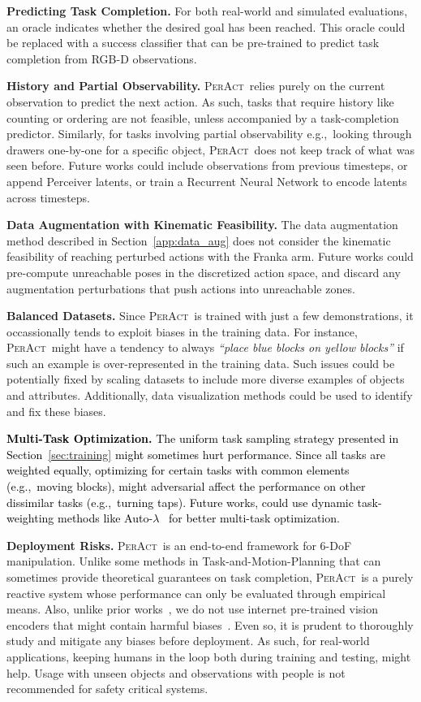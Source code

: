\documentclass{article}
\newcommand{\secref}[1]{Section~\ref{#1}}
\newcommand{\eg}{\textrm{e.g.,}\xspace}
\newcommand{\highlight}[1]{\textcolor{black}{#1}}
\newcommand{\model}{\textsc{PerAct}}
\begin{document}
\textbf{Predicting Task Completion.} For both real-world and simulated evaluations, an oracle indicates whether the desired goal has been reached. This oracle could be replaced with a success classifier that can be pre-trained to predict task completion from RGB-D observations. 

\textbf{History and Partial Observability.} \model~relies purely on the current observation to predict the next action. As such, tasks that require history like counting or ordering are not feasible, unless accompanied by a task-completion predictor. Similarly, for tasks involving partial observability \eg~looking through drawers one-by-one for a specific object, \model~does not keep  track of what was seen before. Future works could include observations from previous timesteps, or append Perceiver latents, or train a Recurrent Neural Network to encode latents across timesteps.

\textbf{Data Augmentation with Kinematic Feasibility.} The data augmentation method described in \secref{app:data_aug} does not consider the kinematic feasibility of reaching perturbed actions with the Franka arm. Future works could pre-compute unreachable poses in the discretized action space, and discard any augmentation perturbations that push actions into unreachable zones.  

\textbf{Balanced Datasets.} Since \model~is trained with just a few demonstrations, it occassionally tends to exploit biases in the training data. For instance, \model~might have a tendency to always \textit{``place blue blocks on yellow blocks''} if such an example is over-represented in the training data. Such issues could be potentially fixed by scaling datasets to include more diverse examples of objects and attributes. Additionally, data visualization methods could be used to identify and fix these biases. 

\highlight{\textbf{Multi-Task Optimization.} The uniform  task sampling strategy presented in \secref{sec:training} might sometimes hurt performance. Since all tasks are weighted equally, optimizing for certain tasks with common elements (\eg~moving blocks), might adversarial affect the performance on other dissimilar tasks (\eg~turning taps). Future works, could use dynamic task-weighting methods like Auto-$\lambda$~\citep{liu2022auto_lambda} for better multi-task optimization.}


\textbf{Deployment Risks.} \model~is an end-to-end framework for 6-DoF manipulation. Unlike some methods in Task-and-Motion-Planning  that can sometimes provide theoretical guarantees on task completion, \model~is a purely reactive system whose performance can only be evaluated through empirical means. Also, unlike prior works~\citep{cliport}, we do not use internet pre-trained vision encoders that might contain harmful biases~\citep{birhane2021multimodal,bender2021dangers}. Even so, it is prudent to thoroughly study and mitigate any biases before deployment. As such, for real-world applications, keeping humans in the loop both during training and testing, might help. Usage with unseen objects and observations with people is not recommended for safety critical systems.
\end{document}
